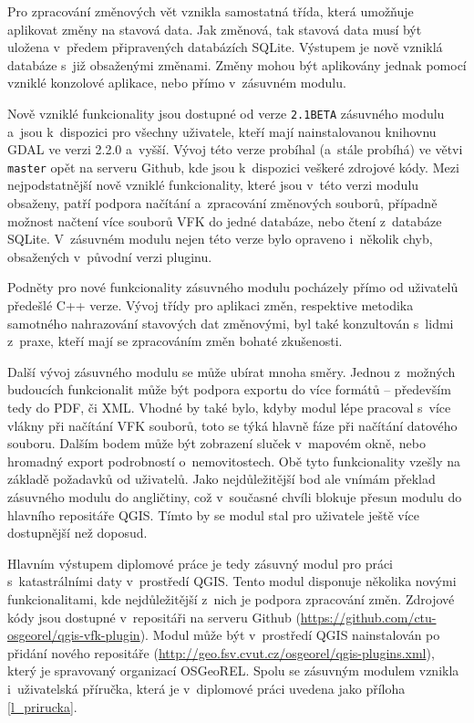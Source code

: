 \documentclass[a4paper,12pt,oneside]{book}
\begin{document}
Pro zpracování změnových vět vznikla samostatná třída, která umožňuje
aplikovat změny na stavová data. Jak změnová, tak stavová data musí být
uložena v~předem připravených databázích SQLite. Výstupem je nově vzniklá
databáze s~již obsaženými změnami. Změny mohou být aplikovány jednak pomocí
vzniklé konzolové aplikace, nebo přímo v~zásuvném modulu.

Nově vzniklé funkcionality jsou dostupné od verze \texttt{2.1BETA}
zásuvného modulu a~jsou k~dispozici pro všechny uživatele, kteří mají
nainstalovanou knihovnu GDAL ve verzi 2.2.0 a~vyšší. Vývoj této verze
probíhal (a~stále probíhá) ve větvi \texttt{master} opět na serveru
Github, kde jsou k~dispozici veškeré zdrojové kódy. Mezi
nejpodstatnější nově vzniklé funkcionality, které jsou v~této verzi
modulu obsaženy, patří podpora načítání a~zpracování změnových
souborů, případně možnost načtení více souborů VFK do jedné databáze,
nebo čtení z~databáze SQLite. V~zásuvném modulu nejen této verze
bylo opraveno i~několik chyb, obsažených v~původní verzi pluginu.

Podněty pro nové funkcionality zásuvného modulu pocházely přímo od
uživatelů předešlé C++ verze. Vývoj třídy pro aplikaci změn,
respektive metodika samotného nahrazování stavových dat změnovými, byl
také konzultován s~lidmi z~praxe, kteří mají se zpracováním změn
bohaté zkušenosti.

Další vývoj zásuvného modulu se může ubírat mnoha směry. Jednou
z~možných budoucích funkcionalit může být podpora exportu do více
formátů -- především tedy do PDF, či XML. Vhodné by také bylo, kdyby
modul lépe pracoval s~více vlákny při načítání VFK souborů, toto se
týká hlavně fáze při načítání datového souboru. Dalším bodem může být
zobrazení sluček v~mapovém okně, nebo hromadný export podrobností
o~nemovitostech. Obě tyto funkcionality vzešly na základě požadavků od
uživatelů. Jako nejdůležitější bod ale vnímám překlad zásuvného modulu
do angličtiny, což v~současné chvíli blokuje přesun modulu do hlavního
repositáře QGIS. Tímto by se modul stal pro uživatele ještě více
dostupnější než doposud.

Hlavním výstupem diplomové práce je tedy zásuvný modul pro práci
s~katastrálními daty v~prostředí QGIS. Tento modul disponuje několika
novými funkcionalitami, kde nejdůležitější z~nich je podpora
zpracování změn. Zdrojové kódy jsou dostupné v~repositáři na serveru
Github (\url{https://github.com/ctu-osgeorel/qgis-vfk-plugin}). Modul
může být v~prostředí QGIS nainstalován po přidání nového repositáře
(\url{http://geo.fsv.cvut.cz/osgeorel/qgis-plugins.xml}), který je
spravovaný organizací OSGeoREL. Spolu se zásuvným modulem vznikla
i~uživatelská příručka, která je v~diplomové práci uvedena jako
příloha \ref{l_prirucka}.
\end{document}
